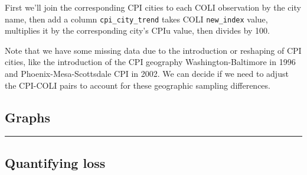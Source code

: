 \documentclass[]{article}
\begin{document}
First we'll join the corresponding CPI cities to each COLI observation
by the city name, then add a column \texttt{cpi\_city\_trend} takes COLI
\texttt{new\_index} value, multiplies it by the corresponding city's
CPIu value, then divides by 100.

Note that we have some missing data due to the introduction or reshaping
of CPI cities, like the introduction of the CPI geography
Washington-Baltimore in 1996 and Phoenix-Mesa-Scottsdale CPI in 2002. We
can decide if we need to adjust the CPI-COLI pairs to account for these
geographic sampling differences.

\hypertarget{graphs}{%
\subsection{Graphs}\label{graphs}}

\begin{center}\rule{0.5\linewidth}{\linethickness}\end{center}

\hypertarget{quantifying-loss}{%
\subsection{Quantifying loss}\label{quantifying-loss}}
\end{document}
